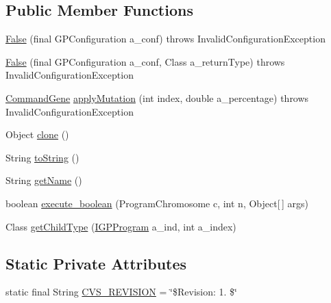 \subsection*{Public Member Functions}
\begin{DoxyCompactItemize}
\item 
\hyperlink{classorg_1_1jgap_1_1gp_1_1terminal_1_1_false_aa41e25e54ff02cccbd7da917047d81b0}{False} (final G\-P\-Configuration a\-\_\-conf)  throws Invalid\-Configuration\-Exception 
\item 
\hyperlink{classorg_1_1jgap_1_1gp_1_1terminal_1_1_false_a56ce3564247b1a4ac77e59bd982e506f}{False} (final G\-P\-Configuration a\-\_\-conf, Class a\-\_\-return\-Type)  throws Invalid\-Configuration\-Exception 
\item 
\hyperlink{classorg_1_1jgap_1_1gp_1_1_command_gene}{Command\-Gene} \hyperlink{classorg_1_1jgap_1_1gp_1_1terminal_1_1_false_a77eae169a5f78f191f1a6cf5319eb884}{apply\-Mutation} (int index, double a\-\_\-percentage)  throws Invalid\-Configuration\-Exception 
\item 
Object \hyperlink{classorg_1_1jgap_1_1gp_1_1terminal_1_1_false_a2bfe4069585a25e474bb54e5dafae0b3}{clone} ()
\item 
String \hyperlink{classorg_1_1jgap_1_1gp_1_1terminal_1_1_false_a5f5102a98d489b5dd95465d982d0e6cf}{to\-String} ()
\item 
String \hyperlink{classorg_1_1jgap_1_1gp_1_1terminal_1_1_false_a6e85efae49e63434a368f7ad609d4968}{get\-Name} ()
\item 
boolean \hyperlink{classorg_1_1jgap_1_1gp_1_1terminal_1_1_false_afe3572fdae925d45f79b8e43bb4aeb31}{execute\-\_\-boolean} (Program\-Chromosome c, int n, Object\mbox{[}$\,$\mbox{]} args)
\item 
Class \hyperlink{classorg_1_1jgap_1_1gp_1_1terminal_1_1_false_ad5afd6f632c5fb05b7786896b286aba2}{get\-Child\-Type} (\hyperlink{interfaceorg_1_1jgap_1_1gp_1_1_i_g_p_program}{I\-G\-P\-Program} a\-\_\-ind, int a\-\_\-index)
\end{DoxyCompactItemize}
\subsection*{Static Private Attributes}
\begin{DoxyCompactItemize}
\item 
static final String \hyperlink{classorg_1_1jgap_1_1gp_1_1terminal_1_1_false_a8ab125322197c9be2d002c892889f700}{C\-V\-S\-\_\-\-R\-E\-V\-I\-S\-I\-O\-N} = \char`\"{}\$Revision\-: 1. \$\char`\"{}
\end{DoxyCompactItemize}
